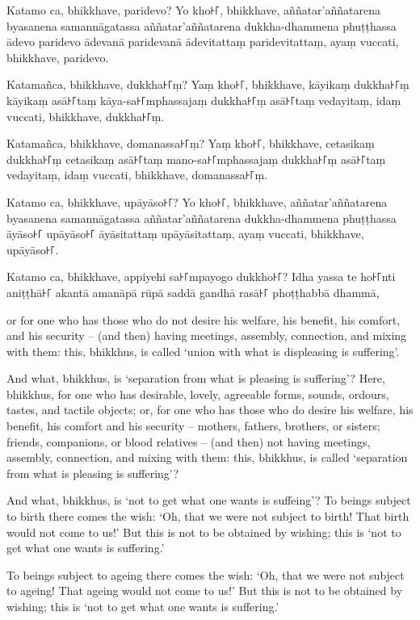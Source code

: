 Katamo ca, bhikkhave, paridevo? Yo kho꜔꜒, bhikkhave, aññatar'aññatarena
byasanena samannāgatassa aññatar'aññatarena dukkha-dhammena phuṭṭhassa
ādevo paridevo ādevanā paridevanā ādevitattaṃ paridevitattaṃ, ayaṃ
vuccati, bhikkhave, paridevo.

Katamañca, bhikkhave, dukkha꜔꜒ṃ? Yaṃ kho꜔꜒, bhikkhave, kāyikaṃ dukkha꜔꜒ṃ kāyikaṃ
asā꜔꜒taṃ kāya-sa꜔꜒mphassajaṃ dukkha꜔꜒ṃ asā꜔꜒taṃ vedayitaṃ, idaṃ vuccati, bhikkhave,
dukkha꜔꜒ṃ.

Katamañca, bhikkhave, domanassa꜔꜒ṃ? Yaṃ kho꜔꜒, bhikkhave, cetasikaṃ dukkha꜔꜒ṃ
cetasikaṃ asā꜔꜒taṃ mano-sa꜔꜒mphassajaṃ dukkha꜔꜒ṃ asā꜔꜒taṃ vedayitaṃ, idaṃ vuccati,
bhikkhave, domanassa꜔꜒ṃ.

Katamo ca, bhikkhave, upāyāso꜔꜒? Yo kho꜔꜒, bhikkhave, aññatar'aññatarena byasanena
samannāgatassa aññatar'aññatarena dukkha-dhammena phuṭṭhassa āyāso꜔꜒ upāyāso꜔꜒
āyāsitattaṃ upāyāsitattaṃ, ayaṃ vuccati, bhikkhave, upāyāso꜔꜒.

Katamo ca, bhikkhave, appiyehi sa꜔꜒mpayogo dukkho꜔꜒? Idha yassa te ho꜔꜒nti aniṭṭhā꜔꜒
akantā amanāpā rūpā saddā gandhā rasā꜔꜒ phoṭṭhabbā dhammā,

\englishPage

or for one who has those who do not desire his welfare, his benefit, his
comfort, and his security -- (and then) having meetings, assembly, connection,
and mixing with them: this, bhikkhus, is called `union with what is displeasing
is suffering'.

And what, bhikkhus, is `separation from what is pleasing is suffering'? Here,
bhikkhus, for one who has desirable, lovely, agreeable forms, sounds, ordours,
tastes, and tactile objects; or, for one who has those who do desire his
welfare, his benefit, his comfort and his security -- mothers, fathers,
brothers, or sisters; friends, companions, or blood relatives -- (and then) not
having meetings, assembly, connection, and mixing with them: this, bhikkhus, is
called `separation from what is pleasing is suffering'?

And what, bhikkhus, is `not to get what one wants is suffeing'? To beings
subject to birth there comes the wish: `Oh, that we were not subject to birth!
That birth would not come to us!' But this is not to be obtained by wishing;
this is `not to get what one wants is suffering.'

To beings subject to ageing there comes the wish: `Oh, that we were not subject
to ageing! That ageing would not come to us!' But this is not to be obtained by
wishing; this is `not to get what one wants is suffering.'

